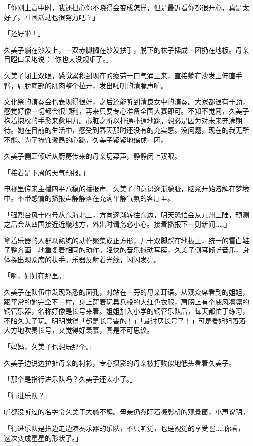 \documentclass[UTF8]{ctexart}
\begin{document}
    「你刚上高中时，我还担心你不晓得会变成怎样，但是最近看你都很开心，真是太好了。社团活动也很努力吧？」 

    「还好啦！」 

    久美子躺在沙发上，一双赤脚搁在沙发扶手，脱下的袜子揉成一团扔在地板。母亲目瞪口呆地说：「你也太没规矩了。」 

    久美子闭上双眼，感觉累积到现在的疲劳一口气涌上来，直接躺在沙发上伸直手臂，肩膀底部的肌肉整个拉开，发出啪叽的清脆声响。 

    文化祭的演奏会也表现得很好，之后还能听到清良女中的演奏。大家都很有干劲，感觉好像一切都会很顺利，再来只要专心准备全国大赛即可。不知不觉间，久美子抱着抱枕的手愈来愈用力。心脏之所以扑通扑通地跳，想必是因为对未来充满期待。她在目前的生活中，感受到春天那时还没有的充实感。没问题，现在的我无所不能。为了掩饰激昂的心跳，久美子紧紧地缩成一团。 

    久美子侧耳倾听从厨房传来的母亲切菜声，静静闭上双眼。 

    「接着是下周的天气预报。」 

    电视里传来主播四平八稳的播报声。久美子的意识逐渐朦胧，脑浆开始溶解在梦境中。不带感情的播报声静静落在充满平静气氛的客厅里。 

    「强烈台风十四号从东海北上，方向逐渐转往东边，明天恐怕会从九州上陆，预测之后会从四国接近近畿地方，外出时请务必小心。接着播报下一则新闻……」 

    拿着乐器的人群以熟练的动作聚集成正方形，几十双脚踩在地板上，统一的雪白鞋子整齐画一地重复着相同的动作。轻快的音乐撼动耳膜，久美子侧耳倾听音乐，身体探出观众席的扶手。乐器反射着光线，闪闪发亮。 

    「啊，姐姐在那里。」 

    久美子在队伍中发现熟悉的面孔，对站在一旁的母亲耳语。从观众席看到的姐姐，跟平常的她完全不一样，身上穿着玩具兵般的大红色衣服，肩膀上有个威风凛凛的铜管乐器，名称好像是长号来着。姐姐加入小学的铜管乐队后，每天都忙于练习，不陪久美子玩。明明觉得「都是长号害的！」「最讨厌长号了！」可是看姐姐落落大方地吹奏长号，又觉得好羡慕，真是不可思议。 

    「妈妈，久美子也想玩那个。」 

    久美子边说边拉扯母亲的衬衫，专心摄影的母亲被打败似地低头看着久美子。 

    「那个是指行进乐队吗？久美子还太小了。」 

    「行进乐队？」 

    听都没听过的名字令久美子大惑不解。母亲仍然盯着摄影机的观景窗，小声说明。 

    「行进乐队是指边走边演奏乐器的乐队，不只听觉，也是视觉的享受喔……你看，这次变成星星的形状了。」 
\end{document}
